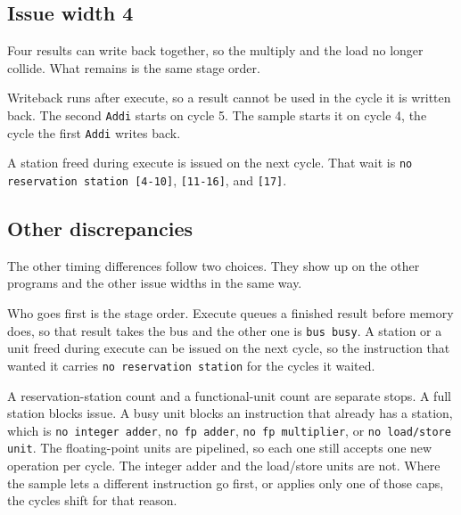 \documentclass[11pt]{article}
\begin{document}
\subsection*{Issue width 4}

Four results can write back together, so the multiply and the load no longer collide. What remains is the same stage order.

Writeback runs after execute, so a result cannot be used in the cycle it is written back. The second \texttt{Addi} starts on cycle 5. The sample starts it on cycle 4, the cycle the first \texttt{Addi} writes back.

A station freed during execute is issued on the next cycle. That wait is \texttt{no reservation station [4-10]}, \texttt{[11-16]}, and \texttt{[17]}.

\subsection*{Other discrepancies}

The other timing differences follow two choices. They show up on the other programs and the other issue widths in the same way.

Who goes first is the stage order. Execute queues a finished result before memory does, so that result takes the bus and the other one is \texttt{bus busy}. A station or a unit freed during execute can be issued on the next cycle, so the instruction that wanted it carries \texttt{no reservation station} for the cycles it waited.

A reservation-station count and a functional-unit count are separate stops. A full station blocks issue. A busy unit blocks an instruction that already has a station, which is \texttt{no integer adder}, \texttt{no fp adder}, \texttt{no fp multiplier}, or \texttt{no load/store unit}. The floating-point units are pipelined, so each one still accepts one new operation per cycle. The integer adder and the load/store units are not. Where the sample lets a different instruction go first, or applies only one of those caps, the cycles shift for that reason.
\end{document}
